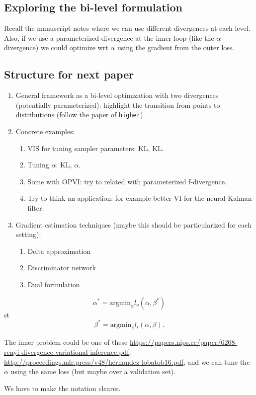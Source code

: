 \subsection{Exploring the bi-level formulation}

Recall the manuscript notes where we can use different divergences at each level.
Also, if we use a parameterized divergence at the inner loop (like the $\alpha$-divergence) we could optimize wrt $\alpha$ using the gradient from the outer loss.

\subsection{Structure for next paper}

\begin{enumerate}
    \item General framework as a bi-level optimization with two divergences (potentially parameterized): highlight the transition from points to distributions (follow the paper of \texttt{higher})
    \item Concrete examples:
    \begin{enumerate}
        \item VIS for tuning sampler parameters: KL, KL.
        \item Tuning $\alpha$: KL, $\alpha$.
        \item Some with OPVI: try to related with parameterized f-divergence.
        \item Try to think an application: for example better VI for the neural Kalman filter.
    \end{enumerate}
    \item Gradient estimation techniques (maybe this should be particularized for each setting):
    \begin{enumerate}
        \item Delta approximation
        \item Discriminator network
        \item Dual formulation
    \end{enumerate}
\end{enumerate}


$$
\alpha^* = \mbox{argmin}_{\alpha} l_o(\alpha, \beta^*)
$$
st
$$
\beta^* = \mbox{argmin}_{\beta} l_i(\alpha, \beta).
$$

The inner problem could be one of these \url{https://papers.nips.cc/paper/6208-renyi-divergence-variational-inference.pdf}, \url{http://proceedings.mlr.press/v48/hernandez-lobatob16.pdf}, and we can tune the $\alpha$ using the same loss (but maybe over a validation set).

We have to make the notation clearer.
\fi
